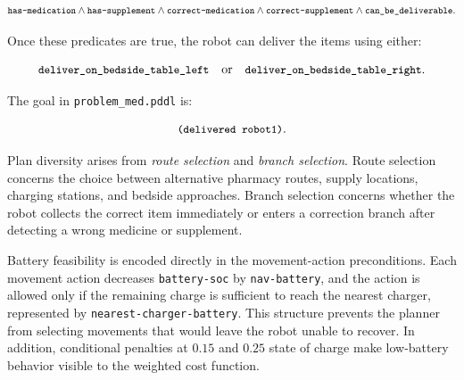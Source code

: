 \documentclass{article}
\newcommand{\pddl}[1]{\texttt{\small #1}}
\begin{document}
\[
\pddl{has-medication}
\wedge
\pddl{has-supplement}
\wedge
\pddl{correct-medication}
\wedge
\pddl{correct-supplement}
\wedge
\pddl{can\_be\_deliverable}.
\]

Once these predicates are true, the robot can deliver the items using either:

\[
\pddl{deliver\_on\_bedside\_table\_left}
\quad \text{or} \quad
\pddl{deliver\_on\_bedside\_table\_right}.
\]

The goal in \pddl{problem\_med.pddl} is:

\[
\pddl{(delivered robot1)}.
\]

Plan diversity arises from \emph{route selection} and \emph{branch selection}.
Route selection concerns the choice between alternative pharmacy routes, supply
locations, charging stations, and bedside approaches. Branch selection concerns
whether the robot collects the correct item immediately or enters a correction
branch after detecting a wrong medicine or supplement.

Battery feasibility is encoded directly in the movement-action preconditions.
Each movement action decreases \pddl{battery-soc} by \pddl{nav-battery}, and the
action is allowed only if the remaining charge is sufficient to reach the nearest
charger, represented by \pddl{nearest-charger-battery}. This structure prevents
the planner from selecting movements that would leave the robot unable to
recover. In addition, conditional penalties at $0.15$ and $0.25$ state of charge
make low-battery behavior visible to the weighted cost function.
\end{document}
